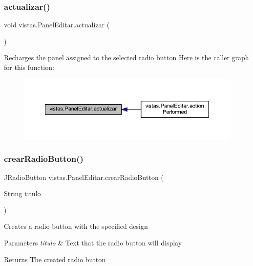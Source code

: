 \subsubsection{\texorpdfstring{actualizar()}{actualizar()}}
{\footnotesize\ttfamily void vistas.\+Panel\+Editar.\+actualizar (\begin{DoxyParamCaption}{ }\end{DoxyParamCaption})}

Recharges the panel assigned to the selected radio button Here is the caller graph for this function\+:
\nopagebreak
\begin{figure}[H]
\begin{center}
\leavevmode
\includegraphics[width=350pt]{classvistas_1_1_panel_editar_a785d026660ee2531aa4fbd29d1377370_icgraph}
\end{center}
\end{figure}
\mbox{\label{classvistas_1_1_panel_editar_aa4871d051f2d6dc289bc087100a49684}} 
\subsubsection{\texorpdfstring{crear\+Radio\+Button()}{crearRadioButton()}}
{\footnotesize\ttfamily J\+Radio\+Button vistas.\+Panel\+Editar.\+crear\+Radio\+Button (\begin{DoxyParamCaption}\item[{String}]{titulo }\end{DoxyParamCaption})}

Creates a radio button with the specified design 
\begin{DoxyParams}{Parameters}
{\em titulo} & Text that the radio button will display \\
\hline
\end{DoxyParams}
\begin{DoxyReturn}{Returns}
The created radio button 
\end{DoxyReturn}
\mbox{\label{classvistas_1_1_panel_editar_ab593922475414274e7e85587fa700e48}} 
